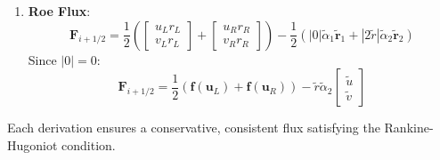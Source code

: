 \documentclass[12pt]{article}
\begin{document}
\begin{enumerate}
    \item \textbf{Roe Flux}:
    \[
    \mathbf{F}_{i+1/2} = \frac{1}{2} \left( \begin{bmatrix} u_L r_L \\ v_L r_L \end{bmatrix} + \begin{bmatrix} u_R r_R \\ v_R r_R \end{bmatrix} \right) - \frac{1}{2} \left( |0| \tilde{\alpha}_1 \tilde{\mathbf{r}}_1 + |2 \tilde{r}| \tilde{\alpha}_2 \tilde{\mathbf{r}}_2 \right)
    \]
    Since \( |0| = 0 \):
    \[
    \mathbf{F}_{i+1/2} = \frac{1}{2} \left( \mathbf{f}(\mathbf{u}_L) + \mathbf{f}(\mathbf{u}_R) \right) - \tilde{r} \tilde{\alpha}_2 \begin{bmatrix} \tilde{u} \\ \tilde{v} \end{bmatrix}
    \]
\end{enumerate}

Each derivation ensures a conservative, consistent flux satisfying the Rankine-Hugoniot condition.
\end{document}
